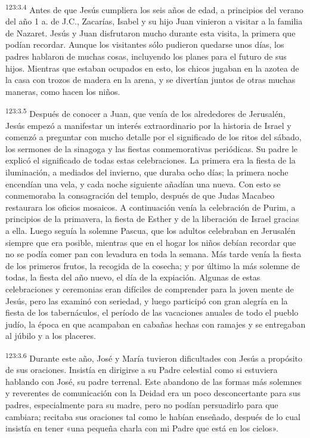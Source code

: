 \par 
\textsuperscript{123:3.4} Antes de que Jesús cumpliera los seis años de edad, a principios del verano del año 1 a. de J.C., Zacarías, Isabel y su hijo Juan vinieron a visitar a la familia de Nazaret. Jesús y Juan disfrutaron mucho durante esta visita, la primera que podían recordar. Aunque los visitantes sólo pudieron quedarse unos días, los padres hablaron de muchas cosas, incluyendo los planes para el futuro de sus hijos. Mientras que estaban ocupados en esto, los chicos jugaban en la azotea de la casa con trozos de madera en la arena, y se divertían juntos de otras muchas maneras, como hacen los niños.

\par 
\textsuperscript{123:3.5} Después de conocer a Juan, que venía de los alrededores de Jerusalén, Jesús empezó a manifestar un interés extraordinario por la historia de Israel y comenzó a preguntar con mucho detalle por el significado de los ritos del sábado, los sermones de la sinagoga y las fiestas conmemorativas periódicas. Su padre le explicó el significado de todas estas celebraciones. La primera era la fiesta de la iluminación, a mediados del invierno, que duraba ocho días; la primera noche encendían una vela, y cada noche siguiente añadían una nueva. Con esto se conmemoraba la consagración del templo, después de que Judas Macabeo restaurara los oficios mosaicos. A continuación venía la celebración de Purim, a principios de la primavera, la fiesta de Esther y de la liberación de Israel gracias a ella. Luego seguía la solemne Pascua, que los adultos celebraban en Jerusalén siempre que era posible, mientras que en el hogar los niños debían recordar que no se podía comer pan con levadura en toda la semana. Más tarde venía la fiesta de los primeros frutos, la recogida de la cosecha; y por último la más solemne de todas, la fiesta del año nuevo, el día de la expiación. Algunas de estas celebraciones y ceremonias eran difíciles de comprender para la joven mente de Jesús, pero las examinó con seriedad, y luego participó con gran alegría en la fiesta de los tabernáculos, el período de las vacaciones anuales de todo el pueblo judío, la época en que acampaban en cabañas hechas con ramajes y se entregaban al júbilo y a los placeres.

\par 
\textsuperscript{123:3.6} Durante este año, José y María tuvieron dificultades con Jesús a propósito de sus oraciones. Insistía en dirigirse a su Padre celestial como si estuviera hablando con José, su padre terrenal. Este abandono de las formas más solemnes y reverentes de comunicación con la Deidad era un poco desconcertante para sus padres, especialmente para su madre, pero no podían persuadirlo para que cambiara; recitaba sus oraciones tal como le habían enseñado, después de lo cual insistía en tener «una pequeña charla con mi Padre que está en los cielos».

